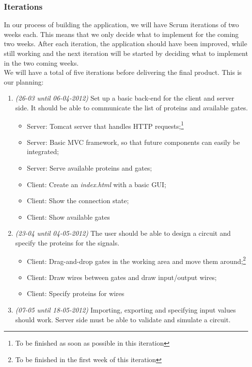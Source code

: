 \documentclass[a4paper]{article}
\begin{document}
\pagebreak
\subsubsection{Iterations}
In our process of building the application, we will have Scrum iterations of two weeks each. This means that we only decide what to implement for the coming two weeks. After each iteration, the application should have been improved, while still working and the next iteration will be started by deciding what to implement in the two coming weeks. \\

\noindent We will have a total of five iterations before delivering the final product. This is our planning:
\begin{enumerate}
\item \emph{(26-03 until 06-04-2012)} Set up a basic back-end for the client and server side. It should be able to communicate the list of proteins and available gates.
	\begin{itemize}
	\item Server: Tomcat server that handles HTTP requests;\footnote[1]{To be finished as soon as possible in this iteration}
	\item Server: Basic MVC framework, so that future components can easily be integrated;\footnotemark[1]
	\item Server: Serve available proteins and gates;
	\item Client: Create an \emph{index.html} with a basic GUI;\footnotemark[1]
	\item Client: Show the connection state;
	\item Client: Show available gates
	\end{itemize}
\item \emph{(23-04 until 04-05-2012)} The user should be able to design a circuit and specify the proteins for the signals.
	\begin{itemize}
	\item Client: Drag-and-drop gates in the working area and move them around;\footnote[2]{To be finished in the first week of this iteration}
	\item Client: Draw wires between gates and draw input/output wires;
	\item Client: Specify proteins for wires
	\end{itemize}
\item \emph{(07-05 until 18-05-2012)} Importing, exporting and specifying input values should work. Server side must be able to validate and simulate a circuit.

\end{enumerate}
\end{document}

